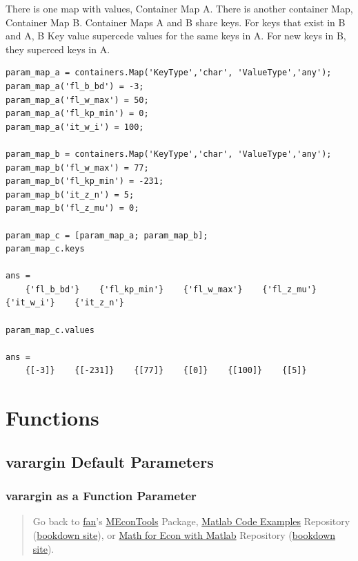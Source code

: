 \documentclass[
]{book}
\begin{document}
There is one map with values, Container Map A. There is another
container Map, Container Map B. Container Maps A and B share keys. For
keys that exist in B and A, B Key value supercede values for the same
keys in A. For new keys in B, they superced keys in A.

\begin{verbatim}
param_map_a = containers.Map('KeyType','char', 'ValueType','any');
param_map_a('fl_b_bd') = -3;
param_map_a('fl_w_max') = 50;
param_map_a('fl_kp_min') = 0;
param_map_a('it_w_i') = 100;

param_map_b = containers.Map('KeyType','char', 'ValueType','any');
param_map_b('fl_w_max') = 77;
param_map_b('fl_kp_min') = -231;
param_map_b('it_z_n') = 5;
param_map_b('fl_z_mu') = 0;

param_map_c = [param_map_a; param_map_b];
param_map_c.keys

ans = 
    {'fl_b_bd'}    {'fl_kp_min'}    {'fl_w_max'}    {'fl_z_mu'}    {'it_w_i'}    {'it_z_n'}

param_map_c.values

ans = 
    {[-3]}    {[-231]}    {[77]}    {[0]}    {[100]}    {[5]}
\end{verbatim}

\hypertarget{functions}{%
\chapter{Functions}\label{functions}}

\hypertarget{varargin-default-parameters}{%
\section{varargin Default Parameters}\label{varargin-default-parameters}}

\hypertarget{varargin-as-a-function-parameter}{%
\subsection{varargin as a Function Parameter}\label{varargin-as-a-function-parameter}}

\begin{quote}
Go back to \href{http://fanwangecon.github.io/}{fan}'s \href{https://fanwangecon.github.io/MEconTools/}{MEconTools} Package, \href{https://fanwangecon.github.io/M4Econ/}{Matlab Code Examples} Repository (\href{https://fanwangecon.github.io/M4Econ/bookdown}{bookdown site}), or \href{https://fanwangecon.github.io/Math4Econ/}{Math for Econ with Matlab} Repository (\href{https://fanwangecon.github.io/Math4Econ/bookdown}{bookdown site}).
\end{quote}
\end{document}
